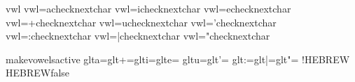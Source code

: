 \newtoks\!vwl
\def\!checknextchar{\viewnextchar{\!ptvwl}}
\def\!!checknextchar{\testforvowelness 
  \ifnextisvowel 
    \!vwl=\expandafter{\the\!vwl\char\nextvowel}%
  \else %
    \nextchar
  \fi
  \!ptvwl
  }
\def\!ptvwl{\!getcurrchar \edef\currvowel{\the\!vwl}\testforspecials 
  \testforvowelness
  \ifnextisvowel
    \edef\currvowel{\currvowel\!nxtvwl}%
    \let\!nxt=\!gbbl
  \else %
    \let\!nxt=\relax
  \fi
  \!!ptvwl \!nxt
}
\def\!!ptvwl{\nulloffset\getloweraxis{\char\currchar}%
  \setbox0=\hbox{\char\currchar}%
  \nobreak\taketwosteps{-.5\wd0}{-\axisoffset}\olap{\currvowel}%
  \nobreak\taketwosteps{.5\wd0}{\axisoffset}}
\def\getvowelmacro#1#2{\expandafter\def\csname vwl#1\endcsname{%
  \noboundary\!vwl={#2}\!checknextchar}}
\getvowelmacro{A}{a}
\getvowelmacro{I}{i}
\getvowelmacro{E}{e}
\getvowelmacro{PLUS}{+}
\getvowelmacro{U}{u}
\getvowelmacro{SHEVA}{'}
\getvowelmacro{COLON}{:}
\getvowelmacro{VERT}{|}
\getvowelmacro{QUOTES}{"}

{\!makevowelsactive
  \!glta=\vwlA \!glt+=\vwlPLUS \!glti=\vwlI \!glte=\vwlE 
  \!gltu=\vwlU \!glt'=\vwlSHEVA
  \!glt:=\vwlCOLON \!glt|=\vwlVERT \!glt"=\vwlQUOTES
} %
\newif\if!HEBREW \!HEBREWfalse
\def\HEBREW{\beginR
   \!HEBREWtrue\endgraf\bgroup\!makevowelsactive }
\def\ENDHEBREW{\egroup\endgraf\!HEBREWfalse\endR}
\def\!offparindent{\leavevmode\setbox0=\lastbox}
\def\[{\!offparindent\bgroup\!HEBREWtrue
   \beginR\!makevowelsactive
   \hfont\!hdefaultfont%
} 
\def\]{\endR\egroup}

\endinput

